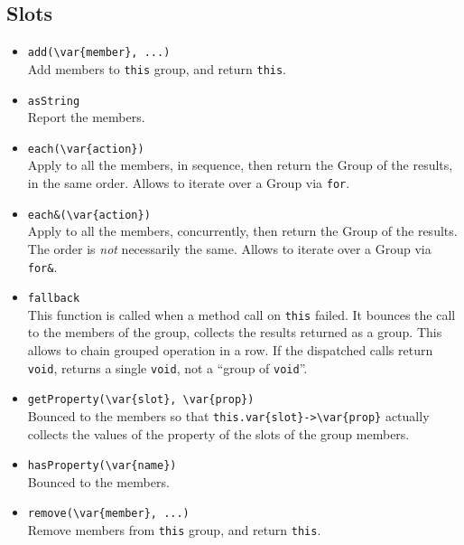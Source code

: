 \subsection{Slots}

\begin{itemize}
\item \lstinline|add(\var{member}, ...)|\\
  Add members to \lstinline|this| group, and return \lstinline|this|.

\item \lstinline|asString|\\
  Report the members.

\item \lstinline|each(\var{action})|\\
  Apply  to all the members, in sequence, then return the
  Group of the results, in the same order.  Allows to iterate over a
  Group via \lstinline|for|.

\item \lstinline|each&(\var{action})|\\
  Apply  to all the members, concurrently, then return the
  Group of the results.  The order is \emph{not} necessarily the same.
  Allows to iterate over a Group via \lstinline|for&|.

\item \lstinline|fallback|\\
  This function is called when a method call on \lstinline|this|
  failed.  It bounces the call to the members of the group, collects
  the results returned as a group.  This allows to chain grouped
  operation in a row.  If the dispatched calls return
  \lstinline|void|, returns a single \lstinline|void|, not a ``group
  of \lstinline|void|''.

\item \lstinline|getProperty(\var{slot}, \var{prop})|\\
  Bounced to the members so that
  \lstinline|this.var{slot}->\var{prop}| actually collects the values
  of the property  of the slots  of the group
  members.

\item \lstinline|hasProperty(\var{name})|\\
  Bounced to the members.

\item \lstinline|remove(\var{member}, ...)|\\
  Remove members from \lstinline|this| group, and return
  \lstinline|this|.


\end{itemize}
